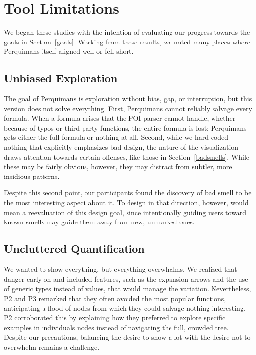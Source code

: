 \documentclass[conference]{IEEEtran}
\newcommand{\toolname}{Perquimans\xspace} \newcommand{\toolnameend}{Perquimans}
\begin{document}
	\section{Tool Limitations} 
	
	We began these studies with the intention of evaluating
	our progress towards the goals in Section~\ref{goals}. Working from these
	results, we noted many places where \toolname itself aligned well or fell short.
	
	\subsection{Unbiased Exploration} 
	
	The goal of \toolname is exploration without bias, gap, or interruption, but 
	this version does not solve everything. First, \toolname cannot reliably
	salvage every formula. When a formula arises that the POI parser cannot handle,
	whether because of typos or third-party functions, the entire formula is lost;
	\toolname gets either the full formula or nothing at all. Second, while we 
	hard-coded nothing that explicitly emphasizes bad design, the nature of the
	visualization draws attention towards certain offenses, like those in
	Section~\ref{badsmells}. While these may be fairly obvious, however, they 
	may distract from subtler, more insidious patterns.
	
	Despite this second point, our participants found the discovery of bad smell
	to be the most interesting aspect about it. To design in that
	direction, however, would mean a reevaluation of this design goal, since
	intentionally guiding users toward known smells may guide them away from new,
	unmarked ones.
	
	\subsection{Uncluttered Quantification}
	
	We wanted to show everything, but everything overwhelms. We realized that danger
	early on and included features, such as the expansion arrows and the use of generic types
	instead of values, that would manage the variation. Nevertheless, P2 and P3 remarked
	that they often avoided the most popular functions, anticipating a flood
	of nodes from which they could salvage nothing interesting. P2 corroborated
	this by explaining how they preferred to explore specific examples in
	individuals nodes instead of navigating the full, crowded tree. Despite our
	precautions, balancing the desire to show a lot with the desire not to
	overwhelm remains a challenge.
	
\end{document}
